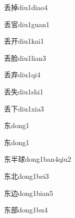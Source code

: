 \begin{verbete}[6;11]{丢掉}{diu1diao4}
\end{verbete}

\begin{verbete}[6;8]{丢官}{diu1guan1}
\end{verbete}

\begin{verbete}[6;4]{丢开}{diu1kai1}
\end{verbete}

\begin{verbete}[6;11]{丢脸}{diu1lian3}
\end{verbete}

\begin{verbete}[6;7]{丢弃}{diu1qi4}
\end{verbete}

\begin{verbete}[6;5]{丢失}{diu1shi1}
\end{verbete}

\begin{verbete}[6;3]{丢下}{diu1xia3}
\end{verbete}

\begin{verbete}[5]{东}{dong1}
\end{verbete}
\begin{verbete*}[5]{东}{dong1}
\end{verbete*}

\begin{verbete*}[5;5;11]{东半球}{dong1ban4qiu2}
\end{verbete*}

\begin{verbete}[5;5]{东北}{dong1bei3}
\end{verbete}

\begin{verbete}[5;5]{东边}{dong1bian5}
\end{verbete}

\begin{verbete}[5;10]{东部}{dong1bu4}
\end{verbete}

